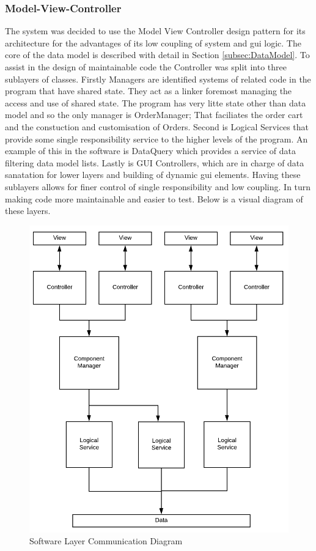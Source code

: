 	\subsubsection{Model-View-Controller}
		The system was decided to use the Model View Controller design pattern for its architecture for the advantages of its low coupling of system and gui logic. The core of the data model is described with detail in Section \ref{subsec:DataModel}. To assist in the design of maintainable code the Controller was split into three sublayers of classes. Firstly Managers are identified systems of related code in the program that have shared state. They act as a linker foremost managing the access and use of shared state. The program has very litte state other than data model and so the only manager is OrderManager; That faciliates the order cart and the constuction and customisation of Orders.
		 Second is Logical Services that provide some single responsibility service to the higher levels of the program. An example of this in the software is DataQuery which provides a service of data filtering data model lists. 
		Lastly is GUI Controllers, which are in charge of data sanatation for lower layers and building of dynamic gui elements.
		Having these sublayers allows for finer control of single responsibility and low coupling. In turn making code more maintainable and easier to test. Below is a visual diagram of these layers.

		\begin{figure}[h]
			\centering
			\includegraphics[width=.6\linewidth]{images/data_model/architecture.png}
			\caption{Software Layer Communication Diagram}
		\end{figure}

